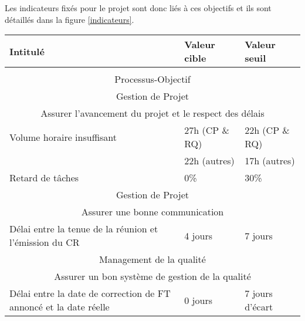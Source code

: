 \documentclass[asi]{picInsa}
\begin{document}
Les indicateurs fixés pour le projet \nomEquipe{} sont donc liés à ces objectifs et ils sont détaillés dans la figure \ref{indicateurs}.

\begin{table}

\begin{tabular}[H]{|p{}|p{}|p{}|}
	\hline
		\rowcolor[gray]{0.45} Intitulé & Valeur cible & Valeur seuil \\\hline
	\rowcolor[gray]{1}
	\multicolumn{3}{|c|}{\cellcolor[gray]{0.65} Indicateurs hebdomadaires} \\\hline

	\multicolumn{3}{|c|}{Processus-Objectif} \\\hline
	\multicolumn{3}{|c|}{\cellcolor[gray]{0.85} Gestion de Projet} \\
	\multicolumn{3}{|c|}{\cellcolor[gray]{0.85} Assurer l'avancement du projet et le respect des délais} \\\hline
	Volume horaire insuffisant & 27h (CP \& RQ) & 22h (CP \& RQ)  \\
	 & 22h (autres) & 17h (autres)  \\\hline
	Retard de tâches & 0\% & 30\% \\\hline
	\multicolumn{3}{|c|}{\cellcolor[gray]{0.85} Gestion de Projet} \\
	\multicolumn{3}{|c|}{\cellcolor[gray]{0.85} Assurer une bonne communication} \\\hline
	Délai entre la tenue de la réunion et l'émission du CR & 4 jours & 7 jours \\\hline
	\multicolumn{3}{|c|}{\cellcolor[gray]{0.85} Management de la qualité} \\
	\multicolumn{3}{|c|}{\cellcolor[gray]{0.85} Assurer un bon système de gestion de la qualité} \\\hline
	Délai entre la date de correction de FT annoncé et la date réelle & 0 jours & 7 jours d'écart \\\hline
	

\end{tabular}
\end{table}
\end{document}
